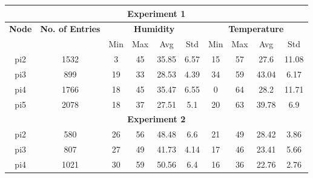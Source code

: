 \documentclass{mpaper}
\begin{document}
\clearpage
\appendix
\begin{table}[]
\centering
\begin{tabular}{|cccccccccc|}
\hline
\multicolumn{10}{|c|}{\textbf{Experiment 1}}                                                                                                                                   \\ \hline
\multicolumn{1}{|c|}{\textbf{Node}} & \multicolumn{1}{c|}{\textbf{No. of Entries}} & \multicolumn{4}{c|}{\textbf{Humidity}}        & \multicolumn{4}{c|}{\textbf{Temperature}} \\ \hline
\multicolumn{1}{|c|}{\textbf{}}     & \multicolumn{1}{c|}{\textbf{}}               & Min & Max & Avg   & \multicolumn{1}{c|}{Std}  & Min     & Max     & Avg       & Std       \\
\multicolumn{1}{|c|}{pi2}           & \multicolumn{1}{c|}{1532}                    & 3   & 45  & 35.85 & \multicolumn{1}{c|}{6.57} & 15      & 57      & 27.6      & 11.08     \\
\multicolumn{1}{|c|}{pi3}           & \multicolumn{1}{c|}{899}                     & 19  & 33  & 28.53 & \multicolumn{1}{c|}{4.39} & 34      & 59      & 43.04     & 6.17      \\
\multicolumn{1}{|c|}{pi4}           & \multicolumn{1}{c|}{1766}                    & 18  & 45  & 35.47 & \multicolumn{1}{c|}{6.55} & 0       & 64      & 28.2      & 11.71     \\
\multicolumn{1}{|c|}{pi5}           & \multicolumn{1}{c|}{2078}                    & 18  & 37  & 27.51 & \multicolumn{1}{c|}{5.1}  & 20      & 63      & 39.78     & 6.9       \\ \hline
\multicolumn{10}{|c|}{\textbf{Experiment 2}}                                                                                                                                   \\ \hline
\multicolumn{1}{|c|}{pi2}           & \multicolumn{1}{c|}{580}                     & 26  & 56  & 48.48 & \multicolumn{1}{c|}{6.6}  & 21      & 49      & 28.42     & 3.86      \\
\multicolumn{1}{|c|}{pi3}           & \multicolumn{1}{c|}{807}                     & 27  & 49  & 41.73 & \multicolumn{1}{c|}{4.14} & 17      & 46      & 23.41     & 5.66      \\
\multicolumn{1}{|c|}{pi4}           & \multicolumn{1}{c|}{1021}                    & 30  & 59  & 50.56 & \multicolumn{1}{c|}{6.4}  & 16      & 36      & 22.76     & 2.76      \\

\end{tabular}
\end{table}
\end{document}
